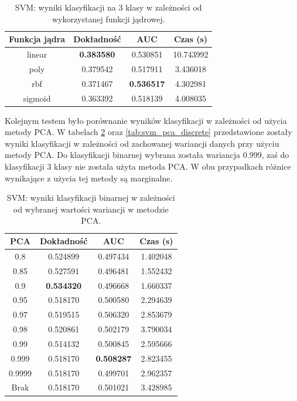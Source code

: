 \documentclass[a4paper, twoside, 11pt, openright]{article}
\begin{document}
\begin{table}[H]
    \centering
    \begin{tabular}{|c|c|c|c|}
    \hline
        \textbf{Funkcja jądra} & \textbf{Dokładność} & \textbf{AUC} & \textbf{Czas (s)} \\ \hline
linear  &  \textbf{0.383580} &  0.530851 &   10.743992 \\ \hline
poly    &  0.379542 &  0.517911 &    3.436018 \\ \hline
rbf     &  0.371467 &  \textbf{0.536517} &    4.302981 \\ \hline
sigmoid &  0.363392 &  0.518139 &    4.008035 \\ \hline
    \end{tabular}
    \caption{SVM: wyniki klasyfikacji na 3 klasy w zależności od wykorzystanej funkcji jądrowej.}
    \label{tab:svm_kernel_discrete}
\end{table}


Kolejnym testem było porównanie wyników klasyfikacji w zależności od użycia metody PCA. W tabelach \ref{tab:svm_pca_binary} oraz \ref{tab:svm_pca_discrete} przedstawione zostały wyniki klasyfikacji w zależności od zachowanej wariancji danych przy użyciu metody PCA. Do klasyfikacji binarnej wybrana została wariancja $0.999$, zaś do klasyfikacji 3 klasy nie została użyta metoda PCA. W obu przypadkach różnice wynikające z użycia tej metody są marginalne.

\begin{table}[H]
    \centering
    \begin{tabular}{|c|c|c|c|}
    \hline
        \textbf{PCA} & \textbf{Dokładność} &  \textbf{AUC} &  \textbf{Czas (s)} \\ \hline
0.8                &  0.524899 &  0.497434 &    1.402048 \\ \hline
0.85               &  0.527591 &  0.496481 &    1.552432 \\ \hline
0.9                &  \textbf{0.534320} &  0.496668 &    1.660337 \\ \hline
0.95               &  0.518170 &  0.500580 &    2.294639 \\ \hline
0.97               &  0.519515 &  0.506320 &    2.853679 \\ \hline
0.98               &  0.520861 &  0.502179 &    3.790034 \\ \hline
0.99               &  0.514132 &  0.500845 &    2.595666 \\ \hline
0.999 				&  0.518170 &  \textbf{0.508287} &    2.823455 \\ \hline
0.9999             &  0.518170 &  0.499701 &    2.962357 \\ \hline
Brak                &  0.518170 &  0.501021 &    3.428985 \\ \hline
    \end{tabular}
    \caption{SVM: wyniki klasyfikacji binarnej w zależności od wybranej wartości wariancji w metodzie PCA.}
    \label{tab:svm_pca_binary}
\end{table}
\end{document}
